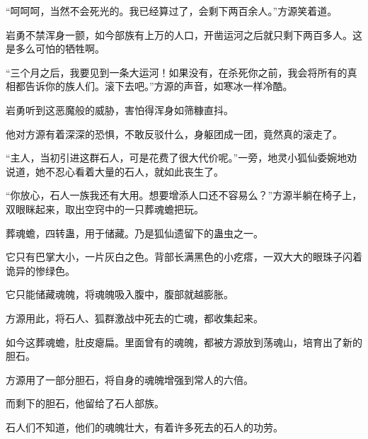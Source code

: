 \begin{this_body}
“呵呵呵，当然不会死光的。我已经算过了，会剩下两百余人。”方源笑着道。

岩勇不禁浑身一颤，如今部族有上万的人口，开凿运河之后就只剩下两百多人。这是多么可怕的牺牲啊。

“三个月之后，我要见到一条大运河！如果没有，在杀死你之前，我会将所有的真相都告诉你的族人们。滚下去吧。”方源的声音，如寒冰一样冷酷。

岩勇听到这恶魔般的威胁，害怕得浑身如筛糠直抖。

他对方源有着深深的恐惧，不敢反驳什么，身躯团成一团，竟然真的滚走了。

“主人，当初引进这群石人，可是花费了很大代价呢。”一旁，地灵小狐仙委婉地劝说道，她不忍心看着大量的石人，就如此丧生了。

“你放心，石人一族我还有大用。想要增添人口还不容易么？”方源半躺在椅子上，双眼眯起来，取出空窍中的一只葬魂蟾把玩。

葬魂蟾，四转蛊，用于储藏。乃是狐仙遗留下的蛊虫之一。

它只有巴掌大小，一片灰白之色。背部长满黑色的小疙瘩，一双大大的眼珠子闪着诡异的惨绿色。

它只能储藏魂魄，将魂魄吸入腹中，腹部就越膨胀。

方源用此，将石人、狐群激战中死去的亡魂，都收集起来。

如今这葬魂蟾，肚皮瘪扁。里面曾有的魂魄，都被方源放到荡魂山，培育出了新的胆石。

方源用了一部分胆石，将自身的魂魄增强到常人的六倍。

而剩下的胆石，他留给了石人部族。

石人们不知道，他们的魂魄壮大，有着许多死去的石人的功劳。

\end{this_body}

